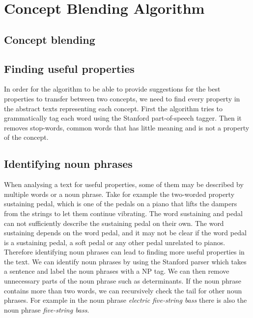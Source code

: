 
\chapter{Concept Blending Algorithm} %

\label{Chapter5} %


\section{Concept blending}


\section{Finding useful properties}
In order for the algorithm to be able to provide suggestions for the best properties to transfer between two concepts, we need to find every property in the abstract texts representing each concept. First the algorithm tries to grammatically tag each word using the Stanford part-of-speech tagger. Then it removes stop-words, common words that has little meaning and is not a property of the concept.


\section{Identifying noun phrases}
When analysing a text for useful properties, some of them may be described by multiple words or a noun phrase. Take for example the two-worded property sustaining pedal, which is one of the pedals on a piano that lifts the dampers from the strings to let them continue vibrating. The word sustaining and pedal can not sufficiently describe the sustaining pedal on their own. The word sustaining depends on the word pedal, and it may not be clear if the word pedal is a sustaining pedal, a soft pedal or any other pedal unrelated to pianos. Therefore identifying noun phrases can lead to finding more useful properties in the text. We can identify noun phrases by using the Stanford parser which takes a sentence and label the noun phrases with a NP tag. We can then remove unnecessary parts of the noun phrase such as determinants. If the noun phrase contains more than two words, we can recursively check the tail for other noun phrases. For example in the noun phrase \emph{electric five-string bass} there is also the noun phrase \emph{five-string bass}.

